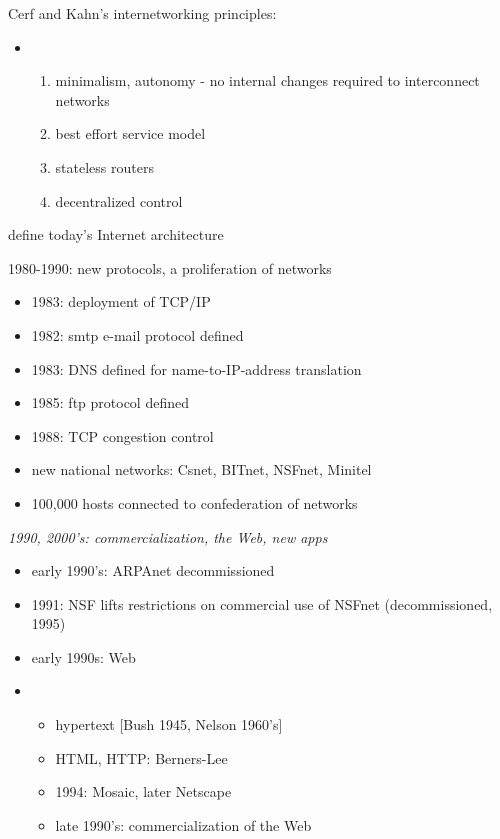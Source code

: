\documentclass[
]{article}
\begin{document}
Cerf and Kahn's internetworking principles:

\begin{itemize}
\item
  \begin{enumerate}
  \def\labelenumi{\arabic{enumi}.}
  \item
    minimalism, autonomy - no internal changes required to interconnect
    networks
  \item
    best effort service model
  \item
    stateless routers
  \item
    decentralized control
  \end{enumerate}
\end{itemize}

define today's Internet architecture

1980-1990: new protocols, a proliferation of networks

\begin{itemize}
\item
  1983: deployment of TCP/IP
\item
  1982: smtp e-mail protocol defined
\item
  1983: DNS defined for name-to-IP-address translation
\item
  1985: ftp protocol defined
\item
  1988: TCP congestion control
\item
  new national networks: Csnet, BITnet, NSFnet, Minitel
\item
  100,000 hosts connected to confederation of networks
\end{itemize}

\emph{1990, 2000's: commercialization, the Web, new apps}

\begin{itemize}
\item
  early 1990's: ARPAnet decommissioned
\item
  1991: NSF lifts restrictions on commercial use of NSFnet
  (decommissioned, 1995)
\item
  early 1990s: Web
\item
  \begin{itemize}
  \item
    hypertext {[}Bush 1945, Nelson 1960's{]}
  \item
    HTML, HTTP: Berners-Lee
  \item
    1994: Mosaic, later Netscape
  \item
    late 1990's: commercialization of the Web
  \end{itemize}
\end{itemize}
\end{document}
